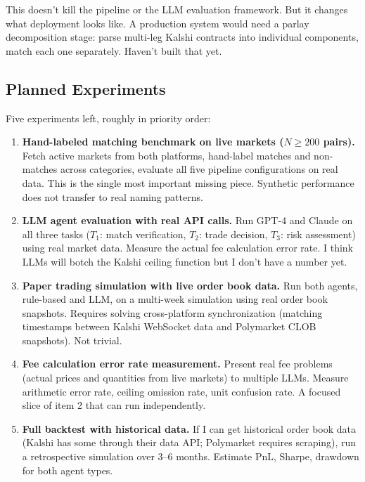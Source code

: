 \documentclass[11pt]{article}
\theoremstyle{definition}
\theoremstyle{remark}
\begin{document}
This doesn't kill the pipeline or the LLM evaluation framework. But it changes what deployment looks like. A production system would need a parlay decomposition stage: parse multi-leg Kalshi contracts into individual components, match each one separately. Haven't built that yet.

\subsection{Planned Experiments}
\label{sec:planned}

Five experiments left, roughly in priority order:

\begin{enumerate}
  \item \textbf{Hand-labeled matching benchmark on live markets ($N \geq 200$ pairs).} Fetch active markets from both platforms, hand-label matches and non-matches across categories, evaluate all five pipeline configurations on real data. This is the single most important missing piece. Synthetic performance does not transfer to real naming patterns.

  \item \textbf{LLM agent evaluation with real API calls.} Run GPT-4 and Claude on all three tasks ($T_1$: match verification, $T_2$: trade decision, $T_3$: risk assessment) using real market data. Measure the actual fee calculation error rate. I think LLMs will botch the Kalshi ceiling function but I don't have a number yet.

  \item \textbf{Paper trading simulation with live order book data.} Run both agents, rule-based and LLM, on a multi-week simulation using real order book snapshots. Requires solving cross-platform synchronization (matching timestamps between Kalshi WebSocket data and Polymarket CLOB snapshots). Not trivial.

  \item \textbf{Fee calculation error rate measurement.} Present real fee problems (actual prices and quantities from live markets) to multiple LLMs. Measure arithmetic error rate, ceiling omission rate, unit confusion rate. A focused slice of item 2 that can run independently.

  \item \textbf{Full backtest with historical data.} If I can get historical order book data (Kalshi has some through their data API; Polymarket requires scraping), run a retrospective simulation over 3--6 months. Estimate PnL, Sharpe, drawdown for both agent types.
\end{enumerate}
\end{document}
